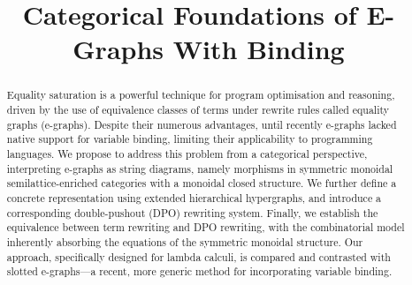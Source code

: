 \documentclass[acmsmall,screen, nonacm, review, anonymous]{acmart}
\title{Categorical Foundations of E-Graphs With Binding}
\begin{document}
\begin{abstract}
    Equality saturation is a powerful technique for program optimisation and reasoning, driven by the use of equivalence classes of terms under rewrite rules called equality graphs (e-graphs). 
    Despite their numerous advantages, until recently e-graphs lacked native support for variable binding, limiting their applicability to programming languages. 
    We propose to address this problem from a categorical perspective, interpreting e-graphs as string diagrams, namely morphisms in symmetric monoidal semilattice-enriched categories with a monoidal closed structure. 
    We further define a concrete representation using extended hierarchical hypergraphs, and introduce a corresponding double-pushout (DPO) rewriting system. 
    Finally, we establish the equivalence between term rewriting and DPO rewriting, with the combinatorial model inherently absorbing the equations of the symmetric monoidal structure. 
    Our approach, specifically designed for lambda calculi, is compared and contrasted with slotted e-graphs—a recent, more generic method for incorporating variable binding.
\end{abstract}

\maketitle






\end{document}
